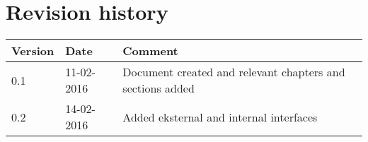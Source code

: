 \label{chp_revisionHistory}
\chapter{Revision history}

\begin{longtable}{| p{1.5cm}  | p{3cm} |  p{8cm} | }
	\hline
	\textbf{Version} & \textbf{Date} & \textbf{Comment} \\
	\hline
	0.1 & 11-02-2016 & Document created and relevant chapters and sections added \\
	\hline
	0.2 & 14-02-2016 & Added eksternal and internal interfaces \\
	\hline
\end{longtable}

